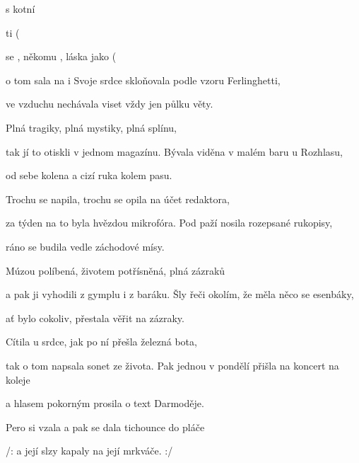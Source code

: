 
\zs
{}  s   kotní   

   ti
\ifdefined\TPBAND
	(
\fi

 se , někomu , láska jako 
\ifdefined\TPBAND
	(
\fi

 o tom sala  na i 
    
\ks
\zs
Svoje srdce skloňovala podle vzoru Ferlinghetti,

ve vzduchu nechávala viset vždy jen půlku věty.

Plná tragiky, plná mystiky,
plná splínu,

tak jí to otiskli v jednom magazínu.
\ks
\zs
Bývala viděna v malém baru u Rozhlasu,

od sebe kolena a cizí ruka kolem pasu.

Trochu se napila, trochu se opila
na účet redaktora,

za týden na to byla hvězdou mikrofóra.
\ks
\zs
Pod paží nosila rozepsané rukopisy,

ráno se budila vedle záchodové mísy.

Múzou políbená, životem potřísněná,
plná zázraků

a pak ji vyhodili z gymplu i z baráku.
\ks
\zs
Šly řeči okolím, že měla něco se esenbáky,

ať bylo cokoliv, přestala věřit na zázraky.

Cítila u srdce, jak po ní přešla
železná bota,

tak o tom napsala sonet ze života.
\ks
\zs
Pak jednou v pondělí přišla na koncert na koleje

a hlasem pokorným prosila o text Darmoděje.

Pero si vzala a pak se dala
tichounce do pláče

/: a její slzy kapaly na její mrkváče. :/
\ks
\kp
